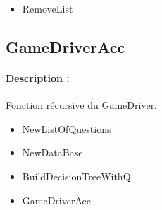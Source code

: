 \documentclass[10pt,a4paper]{article}
\begin{document}
\begin{itemize}
\item RemoveList
\end{itemize}

\subsection{GameDriverAcc}
\paragraph{Description :} Fonction récursive du GameDriver.

\begin{itemize}
\item NewListOfQuestions
\item NewDataBase
\item BuildDecisionTreeWithQ
\item GameDriverAcc
\end{itemize}
\end{document}

